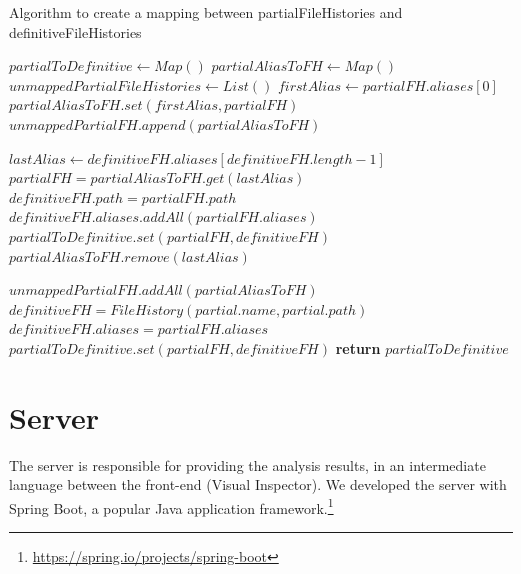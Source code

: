 \begin{algorithm}
    \caption{Algorithm to create a mapping between partialFileHistories and definitiveFileHistories}
    \begin{algorithmic}[1]
        \State $partialToDefinitive \gets Map()$
        \State $partialAliasToFH \gets Map()$ 
        \State $unmappedPartialFileHistories \gets List()$  
            \State $firstAlias \gets partialFH.aliases[0]$
                \State $partialAliasToFH.set(firstAlias, partialFH)$  
            \Else
                \State $unmappedPartialFH.append(partialAliasToFH)$  
            \EndIf
        \EndFor

         
            \State $lastAlias \gets definitiveFH.aliases[definitiveFH.length - 1]$
                \State $partialFH = partialAliasToFH.get(lastAlias)$
                \State $definitiveFH.path = partialFH.path$
                \State $definitiveFH.aliases.addAll(partialFH.aliases)$
                \State $partialToDefinitive.set(partialFH, definitiveFH)$
                \State $partialAliasToFH.remove(lastAlias)$
            \EndIf
        \EndFor

        \State $unmappedPartialFH.addAll(partialAliasToFH)$ 
            \State $definitiveFH = FileHistory(partial.name, partial.path)$
            \State $definitiveFH.aliases = partialFH.aliases $
            \State $partialToDefinitive.set(partialFH, definitiveFH)$
        \EndFor
        \State \textbf{return} $partialToDefinitive$
    \EndProcedure
    \end{algorithmic}
\end{algorithm}


\section{Server}
The server is responsible for providing the analysis results, in an intermediate language between the 
front-end (Visual Inspector). We developed the server with Spring Boot, a popular Java application framework.\footnote{\url{https://spring.io/projects/spring-boot}}

